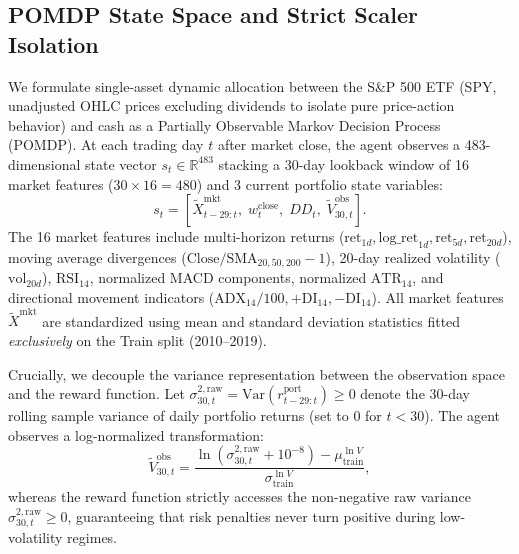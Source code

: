 \documentclass[10pt,twocolumn,conference]{IEEEtran}
\begin{document}
\subsection{POMDP State Space and Strict Scaler Isolation}
We formulate single-asset dynamic allocation between the S\&P 500 ETF (SPY, unadjusted OHLC prices excluding dividends to isolate pure price-action behavior) and cash as a Partially Observable Markov Decision Process (POMDP). At each trading day $t$ after market close, the agent observes a 483-dimensional state vector $s_t \in \mathbb{R}^{483}$ stacking a 30-day lookback window of 16 market features ($30 \times 16 = 480$) and 3 current portfolio state variables:
\begin{equation}
    s_t = \left[ \tilde{X}_{t-29:t}^{\text{mkt}}, \; w_t^{\text{close}}, \; DD_t, \; \tilde{V}_{30,t}^{\text{obs}} \right].
\end{equation}
The 16 market features include multi-horizon returns ($\text{ret}_{1d}, \text{log\_ret}_{1d}, \text{ret}_{5d}, \text{ret}_{20d}$), moving average divergences ($\text{Close}/\text{SMA}_{20,50,200}-1$), 20-day realized volatility ($\text{vol}_{20d}$), $\text{RSI}_{14}$, normalized MACD components, normalized $\text{ATR}_{14}$, and directional movement indicators ($\text{ADX}_{14}/100, +\text{DI}_{14}, -\text{DI}_{14}$). All market features $\tilde{X}^{\text{mkt}}$ are standardized using mean and standard deviation statistics fitted \emph{exclusively} on the Train split (2010--2019).

Crucially, we decouple the variance representation between the observation space and the reward function. Let $\sigma_{30,t}^{2,\text{raw}} = \text{Var}(r_{t-29:t}^{\text{port}}) \ge 0$ denote the 30-day rolling sample variance of daily portfolio returns (set to $0$ for $t < 30$). The agent observes a log-normalized transformation:
\begin{equation}
    \tilde{V}_{30,t}^{\text{obs}} = \frac{\ln(\sigma_{30,t}^{2,\text{raw}} + 10^{-8}) - \mu_{\text{train}}^{\ln V}}{\sigma_{\text{train}}^{\ln V}},
\end{equation}
whereas the reward function strictly accesses the non-negative raw variance $\sigma_{30,t}^{2,\text{raw}} \ge 0$, guaranteeing that risk penalties never turn positive during low-volatility regimes.
\end{document}
